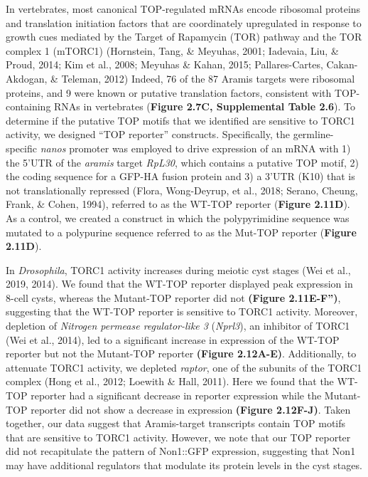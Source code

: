 \documentclass[12pt,oneside]{reedthesis}
\begin{document}
In vertebrates, most canonical TOP-regulated mRNAs encode ribosomal
proteins and translation initiation factors that are coordinately
upregulated in response to growth cues mediated by the Target of
Rapamycin (TOR) pathway and the TOR complex 1 (mTORC1)
(Hornstein, Tang, \& Meyuhas, 2001; Iadevaia, Liu, \& Proud, 2014; Kim et al., 2008; Meyuhas \& Kahan, 2015; Pallares-Cartes, Cakan-Akdogan, \& Teleman, 2012) Indeed, 76 of the
87 Aramis targets were ribosomal proteins, and 9 were known or putative
translation factors, consistent with TOP-containing RNAs in vertebrates
(\textbf{Figure 2.7C, Supplemental Table 2.6}). To determine if the putative TOP
motifs that we identified are sensitive to TORC1 activity, we designed
``TOP reporter'' constructs. Specifically, the germline-specific \emph{nanos}
promoter was employed to drive expression of an mRNA with 1) the 5'UTR
of the \emph{aramis} target \emph{RpL30}, which contains a putative TOP motif, 2)
the coding sequence for a GFP-HA fusion protein and 3) a 3'UTR (K10)
that is not translationally repressed (Flora, Wong-Deyrup, et al., 2018; Serano, Cheung, Frank, \& Cohen, 1994), referred to as the WT-TOP
reporter (\textbf{Figure 2.11D}). As a control, we created a construct in which
the polypyrimidine sequence was mutated to a polypurine sequence
referred to as the Mut-TOP reporter (\textbf{Figure 2.11D}).

In \emph{Drosophila}, TORC1 activity increases during meiotic cyst stages
(Wei et al., 2019, 2014). We found that the WT-TOP reporter displayed
peak expression in 8-cell cysts, whereas the Mutant-TOP reporter did not
\textbf{(Figure 2.11E-F'')}, suggesting that the WT-TOP reporter is sensitive to
TORC1 activity. Moreover, depletion of \emph{Nitrogen permease regulator-like
3} (\emph{Nprl3}), an inhibitor of TORC1 (Wei et al., 2014), led to a significant
increase in expression of the WT-TOP reporter but not the Mutant-TOP
reporter \textbf{(Figure 2.12A-E)}. Additionally, to attenuate TORC1 activity,
we depleted \emph{raptor}, one of the subunits of the TORC1 complex
(Hong et al., 2012; Loewith \& Hall, 2011). Here we found that the WT-TOP
reporter had a significant decrease in reporter expression while the
Mutant-TOP reporter did not show a decrease in expression \textbf{(Figure 2.12F-J)}.
Taken together, our data suggest that Aramis-target
transcripts contain TOP motifs that are sensitive to TORC1 activity.
However, we note that our TOP reporter did not recapitulate the pattern
of Non1::GFP expression, suggesting that Non1 may have additional
regulators that modulate its protein levels in the cyst stages.
\end{document}
